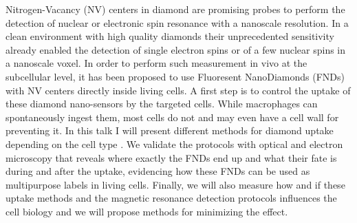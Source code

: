 Nitrogen-Vacancy (NV) centers in diamond are promising probes to perform the detection of nuclear or electronic spin resonance with a nanoscale resolution. In a clean environment with high quality diamonds their unprecedented sensitivity already enabled the detection of single electron spins or of a few nuclear spins in a nanoscale voxel. In order to perform such measurement in vivo at the subcellular level, it has been proposed to use Fluoresent NanoDiamonds (FNDs) with NV centers directly inside living cells.
A first step is to control the uptake of these diamond nano-sensors by the targeted cells. While macrophages can spontaneously ingest them, most cells do not and may even have a cell wall for preventing it. In this talk I will present different methods for diamond uptake depending on the cell type \cite{Hemelaar_2017,Zheng_2017}. We validate the protocols with optical and electron microscopy that reveals where exactly the FNDs end up and what their fate is during and after the uptake, evidencing how these FNDs can be used as multipurpose labels \cite{Hemelaar_2017a} in living cells. Finally, we will also measure how and if these uptake methods and the magnetic resonance detection protocols influences the cell biology and we will propose methods for minimizing the effect.